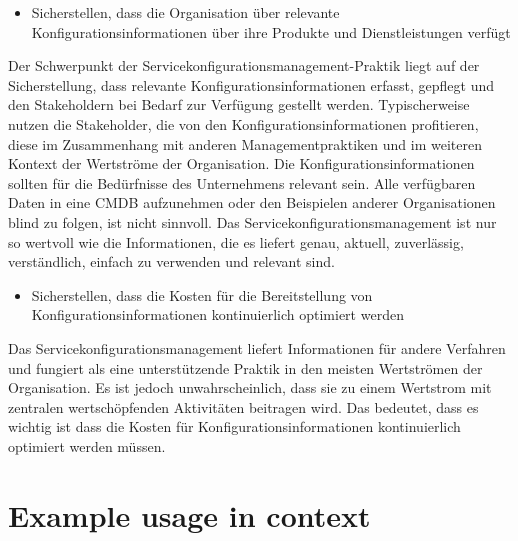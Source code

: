 \begin{itemize}
	\item Sicherstellen, dass die Organisation über relevante Konfigurationsinformationen über ihre Produkte und Dienstleistungen verfügt
\end{itemize}

\noindent
Der Schwerpunkt der Servicekonfigurationsmanagement-Praktik liegt auf der Sicherstellung, dass relevante Konfigurationsinformationen
erfasst, gepflegt und den Stakeholdern bei Bedarf zur Verfügung gestellt werden.
Typischerweise nutzen die Stakeholder, die von den Konfigurationsinformationen profitieren, diese im Zusammenhang mit anderen
Managementpraktiken und im weiteren Kontext der Wertströme der Organisation.
Die Konfigurationsinformationen sollten für die Bedürfnisse des Unternehmens relevant sein. Alle verfügbaren
Daten in eine CMDB aufzunehmen oder den Beispielen anderer Organisationen blind zu folgen, ist nicht sinnvoll. Das
Servicekonfigurationsmanagement ist nur so wertvoll wie die Informationen, die es liefert
genau, aktuell, zuverlässig, verständlich, einfach zu verwenden und relevant sind.

\begin{itemize}
	\item Sicherstellen, dass die Kosten für die Bereitstellung von Konfigurationsinformationen kontinuierlich optimiert werden
\end{itemize}

\noindent
Das Servicekonfigurationsmanagement liefert Informationen für andere Verfahren und fungiert als
eine unterstützende Praktik in den meisten Wertströmen der Organisation. Es ist jedoch unwahrscheinlich, dass sie
zu einem Wertstrom mit zentralen wertschöpfenden Aktivitäten beitragen wird. Das bedeutet, dass es wichtig ist
dass die Kosten für Konfigurationsinformationen kontinuierlich optimiert werden müssen.

\section{Example usage in context}
